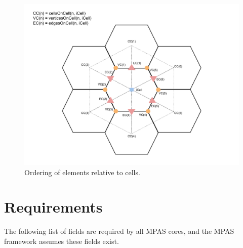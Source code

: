 \documentclass[11pt]{report}
\begin{document}
\begin{figure}[htp!]
	\centering
	\includegraphics[scale=0.4]{figures/CellDiagram.pdf}
	\caption{Ordering of elements relative to cells.}
\end{figure}


\chapter{Requirements}

The following list of fields are required by all MPAS cores, and the MPAS framework assumes these fields exist.
\end{document}
